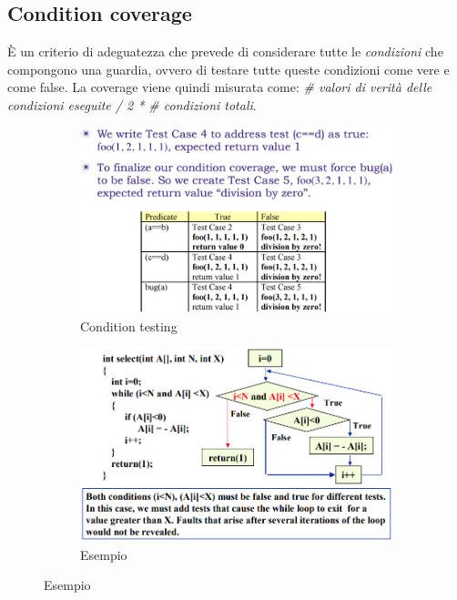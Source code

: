 \documentclass[a4paper,oneside,titlepage]{book}
\begin{document}
\subsection{Condition coverage}
\`{E} un criterio di adeguatezza che prevede di considerare tutte le \textit{condizioni} che compongono una guardia, ovvero di testare tutte queste condizioni come vere e come false. La coverage viene quindi misurata come: \textit{\# valori di verità delle condizioni eseguite / 2 * \# condizioni totali}.
\newpage
\begin{figure}[htp]
	\begin{subfigure}{0.49\textwidth}
	    \centering
		\includegraphics[width=\textwidth, height=\textheight, keepaspectratio]{condition1.png}
		\caption{Condition testing}
	\end{subfigure}
	\hfill
	\begin{subfigure}{0.49\textwidth}
	    \centering
		\includegraphics[width=\textwidth, height=\textheight, keepaspectratio]{condition2.png}
		\caption{Esempio}
	\end{subfigure}
\end{figure}
\end{document}
